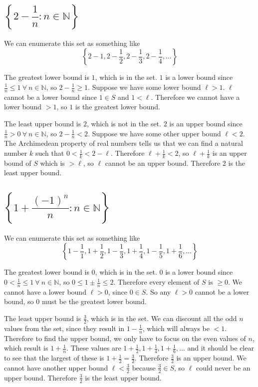 \documentclass[a4paper]{article}
\begin{document}
\subsection{$\left\{ 2 - \dfrac{1}{n} : n \in \mathbb{N} \right\}$}

We can enumerate this set as something like $$\left\{ 2 - 1, 2 - \frac12, 2 - \frac13, 2 - \frac14, \ldots \right\}$$

The greatest lower bound is $1$, which is in the set. $1$ is a lower bound since $\frac1n \le 1\ \forall\ n \in \mathbb N$, so $2 - \frac1n \ge 1$. Suppose we have some lower bound $\ell > 1$. $\ell$ cannot be a lower bound since $1 \in S$ and $1 < \ell$. Therefore we cannot have a lower bound $> 1$, so $1$ is the greatest lower bound.

The least upper bound is $2$, which is not in the set. $2$ is an upper bound since $\frac1n > 0\ \forall\ n \in \mathbb N$, so $2 - \frac1n < 2$. Suppose we have some other upper bound $\ell < 2$. The Archimedean property of real numbers tells us that we can find a natural number $k$ such that $0 < \frac1k < 2 - \ell$. Therefore $\ell + \frac1k < 2$, so $\ell + \frac1k$ is an upper bound of $S$ which is $> \ell$, so $\ell$ cannot be an upper bound. Therefore $2$ is the least upper bound.

\subsection{$\left\{ 1 + \dfrac{(-1)^n}{n} : n \in \mathbb{N} \right\}$}

We can enumerate this set as something like $$\left\{ 1 - \frac11, 1 + \frac12, 1 - \frac13, 1 + \frac14, 1 - \frac15, 1 + \frac16, \ldots \right\}$$

The greatest lower bound is $0$, which is in the set. $0$ is a lower bound since $0 < \frac1n \le 1\ \forall\ n \in \mathbb N$, so $0 \le 1 \pm \frac1n \le 2$. Therefore every element of $S$ is $\ge 0$. We cannot have a lower bound $\ell > 0$, since $0 \in S$. So any $\ell > 0$ cannot be a lower bound, so $0$ must be the greatest lower bound.

The least upper bound is $\frac32$, which is in the set. We can discount all the odd $n$ values from the set, since they result in $1 - \frac1n$, which will always be $< 1$. Therefore to find the upper bound, we only have to focus on the even values of $n$, which result is $1 + \frac1n$. These values are $1 + \frac12, 1 + \frac14, 1 + \frac16, \ldots$ and it should be clear to see that the largest of these is $1 + \frac12 = \frac32$. Therefore $\frac32$ is an upper bound. We cannot have another upper bound $\ell < \frac32$ because $\frac32 \in S$, so $\ell$ could never be an upper bound. Therefore $\frac32$ is the least upper bound.
\end{document}
